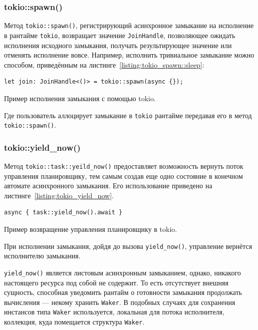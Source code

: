 \subsubsection{tokio::spawn()}

Метод \verb|tokio::spawn()|, регистрирующий асинхронное замыкание на исполнение в рантайме \verb|tokio|, возвращает значение \verb|JoinHandle|, позволяющее ожидать исполнения исходного замыкания, получать результирующее значение или отменять исполнение вовсе. Например, исполнить тривиальное замыкание можно способом, приведённым на листинге~\ref{listing:tokio_spawn::sleep}:

\begin{listing}[H]
    \begin{verbatim}
let join: JoinHandle<()> = tokio::spawn(async {});
    \end{verbatim}

    \caption{Пример исполнения замыкания с помощью tokio.}
    \label{listing:tokio_spawn::sleep}
\end{listing}

Где пользователь аллоцирует замыкание в \verb|tokio| рантайме передавая его в метод \verb|tokio::spawn()|.

\subsubsection{tokio::yield\_now()}

Метод \verb|tokio::task::yeild_now()| предоставляет возможность вернуть поток управления планировщику, тем самым создав еще одно состояние в конечном автомате асинхронного замыкания. Его использование приведено на листинге~\ref{listing:tokio_yield_now}.

\begin{listing}[H]
    \begin{verbatim}
async { task::yield_now().await }
    \end{verbatim}

    \caption{Пример возвращение управления планировщику в tokio.}
    \label{listing:tokio_yield_now}
\end{listing}

При исполнении замыкания, дойдя до вызова  \verb|yield_now()|, управление вернётся исполнителю замыкания.

\verb|yield_now()| является листовым асинхронным замыканием, однако, никакого настоящего ресурса под собой не содержит. То есть отсутствует внешняя сущность, способная уведомить рантайм о готовности замыкания продолжать вычисления --- некому хранить \verb|Waker|. В подобных случаях для сохранения инстансов типа \verb|Waker| используется, локальная для потока исполнителя, коллекция, куда помещается структура \verb|Waker|.

